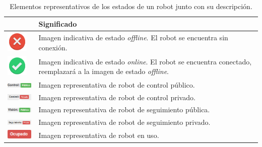 \begin{table}[H]
  \begin{center}
    \begin{tabular}{|p{2cm}|p{10cm}|}
      \hline
      \centering{Elemento} & \qquad \quad Significado \\
      \hline
      \includegraphics[width=1cm]{imagenes/manual-usuario/offline.png} & Imagen indicativa de estado \emph{offline}. El robot se encuentra sin conexión. \\
      \hline
      \includegraphics[width=1cm]{imagenes/manual-usuario/online.png} & Imagen indicativa de estado \emph{online}. El robot se encuentra conectado, reemplazará a la imagen de estado \emph{offline}. \\
      \hline
      \includegraphics[width=2cm]{imagenes/manual-usuario/control-publico.png} & Imagen representativa de robot de control público. \\
      \hline
      \includegraphics[width=2cm]{imagenes/manual-usuario/control-privado.png} & Imagen representativa de robot de control privado. \\
      \hline
      \includegraphics[width=2cm]{imagenes/manual-usuario/vision-publico.png} & Imagen representativa de robot de seguimiento pública. \\
      \hline
      \includegraphics[width=2.2cm]{imagenes/manual-usuario/seguimiento-privado.png} & Imagen representativa de robot de seguimiento privado. \\
      \hline
      \includegraphics[width=2.2cm]{imagenes/manual-usuario/ocupado.png} & Imagen representativa de robot en uso. \\
      \hline
    \end{tabular}
  \end{center}
\caption{Elementos representativos de los estados de un robot junto con su descripción.}
\label{table:robot-estados}
\end{table}


